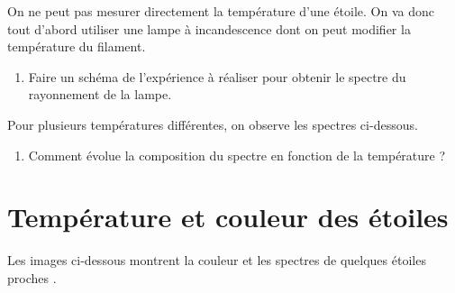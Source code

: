 \documentclass[12pt,a4paper,fleqn]{article}
\begin{document}
On ne peut pas mesurer directement la température d'une étoile.
On va donc tout d'abord utiliser une lampe à incandescence dont on peut modifier la température du filament.

\begin{enumerate}[resume]
\item \rea{}

Faire un schéma de l'expérience à réaliser pour obtenir le spectre du rayonnement de la lampe.%
\thumbsup{}

\vspace{150pt}
\end{enumerate}

\begin{appel}
\rea{}
\end{appel}

Pour plusieurs températures différentes, on observe les spectres ci-dessous.
\vspace{120pt}

\begin{enumerate}[resume]
\item \app{} \anarai{}

Comment évolue la composition du spectre en fonction de la température ? \thumbsup{}

\end{enumerate}

\begin{center}
\end{center}

\section*{Température et couleur des étoiles}

Les images ci-dessous montrent la couleur et les spectres de quelques étoiles \og proches \fg{}.
\end{document}
